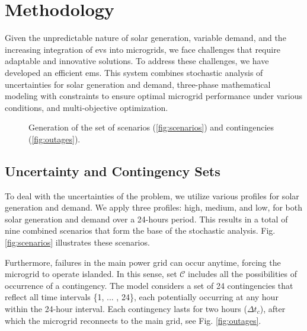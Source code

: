 \documentclass[preprint, 10pt, 5p]{elsarticle}
\begin{document}
\section{Methodology}\label{sec:methodology}

Given the unpredictable nature of solar generation, variable demand,
and the increasing integration of \glspl{ev} into microgrids, 
we face challenges that require adaptable and innovative solutions. 
To address these challenges, we have developed an efficient \gls{ems}. 
This system combines stochastic analysis of 
uncertainties for solar generation and demand, three-phase mathematical 
modeling with constraints to ensure optimal microgrid performance under 
various conditions, and multi-objective optimization. 


\begin{figure}[htb!]
    \centering
    \hfill
    \caption{Generation of the set of scenarios (\ref{fig:scenarios}) and 
        contingencies (\ref{fig:outages}).}
    \label{fig:scenarios and outages}
\end{figure}

\subsection{Uncertainty and Contingency Sets}

To deal with the uncertainties of the problem, we utilize various profiles 
for solar generation and demand. We apply three profiles: 
high, medium, and low, for both solar generation and demand over a 24-hours 
period. This results in a total of nine combined scenarios that 
form the base of the stochastic analysis. Fig. \ref{fig:scenarios} illustrates
these scenarios.

Furthermore, failures in the main power grid can occur anytime, forcing the 
microgrid to operate islanded. In this sense,  set $\mathcal{C}$ includes 
all the possibilities of occurrence of a contingency. 
The model considers a set of 
24 contingencies that reflect all time intervals \{1, ... , 24\}, 
each potentially occurring at any hour within the 24-hour interval. 
Each contingency lasts for two hours ($\Delta t_c$), after which the microgrid 
reconnects to the main grid, see Fig. \ref{fig:outages}.
\end{document}
